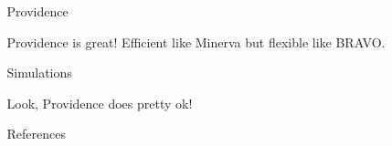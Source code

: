 \documentclass[final]{beamer}
\newlength{\sepwidth}
\newlength{\colwidth}
\newcommand{\separatorcolumn}{\begin{column}{\sepwidth}\end{column}}
\begin{document}
\begin{frame}[t]
\begin{columns}[t]
\begin{column}{\colwidth}
\end{column}

\separatorcolumn

\begin{column}{\colwidth}

\begin{block}{Providence}

Providence is great! Efficient like Minerva but flexible like BRAVO.

\end{block}

\begin{block}{Simulations}

Look, Providence does pretty ok!

\end{block}



  \begin{block}{References}

    \nocite{*}
    \footnotesize{}

  \end{block}


\end{column}

\separatorcolumn

\end{columns}

\end{frame}
\end{document}
